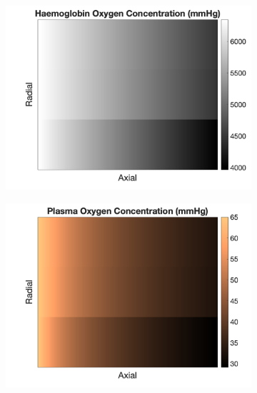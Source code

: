 \documentclass[12pt]{article}
\begin{document}
\begin{figure}[ht]
\begin{subfigure}{0.5\textwidth}
\centering
    \includegraphics[width=\linewidth]{haemo.png} 
    \caption{}
    \label{fig:oxy_1}
\end{subfigure}
\hfill
\begin{subfigure}{0.5\textwidth}
\centering
    \includegraphics[width=\linewidth]{plasma.png} 
    \caption{}
   \label{fig:oxy_2}
\end{subfigure}
\hfill
\begin{subfigure}{0.5\textwidth}
\centering

\end{subfigure}
\end{figure}
\end{document}

